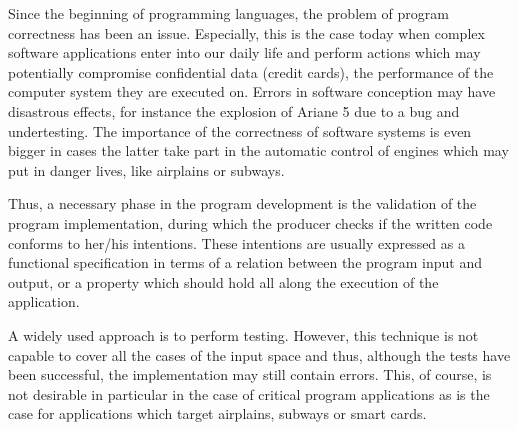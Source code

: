 Since the beginning of programming languages, the problem of program correctness has been an issue. 
Especially, this is the case today when complex software applications  enter into our daily life and perform actions 
which may potentially compromise confidential data (credit cards), the performance of the
 computer system they are executed on. 
 Errors in software conception may have disastrous effects, for instance 
the explosion of Ariane 5 due to a bug and undertesting. The importance of the correctness
of software systems is even bigger in cases the latter take part in the automatic 
control of engines which may put in danger lives, like airplains or subways.




Thus, a necessary phase in the program development is the validation of the program implementation, during which 
the producer checks if the written code conforms to her/his intentions. 
These intentions are usually expressed as  a functional specification in terms of a relation between the program
input and output, or a property which  should hold all along the execution of the application. 

A widely used approach is to perform testing. However, this technique is not capable
to cover all the cases of the input space and thus, although the tests have been successful, 
the implementation may still contain errors. This, of course, is not desirable in particular in the case of critical 
program applications as is the case for applications which target airplains, subways or smart cards. 

